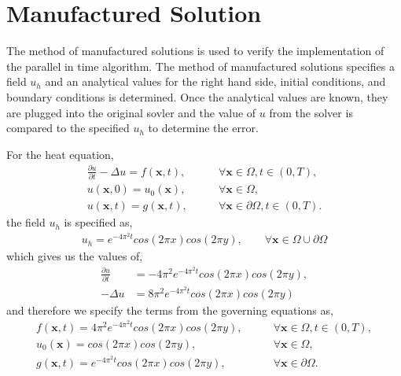 \documentclass{article}
\begin{document}
\section{Manufactured Solution}
\label{sec:MFGSol}

The method of manufactured solutions is used to verify the implementation of the
parallel in time algorithm.
The method of manufactured solutions specifies a field $u_h$ and an
analytical values for the right hand side, initial conditions, and boundary
conditions is determined.
Once the analytical values are known, they are plugged into the original sovler
and the value of $u$ from the solver is compared to the specified $u_h$ to
determine the error.

For the heat equation,
\begin{align*}
  \frac{\partial u}{\partial t} - \Delta u = f(\boldsymbol{x},t), \qquad &\forall\boldsymbol{x}\in\Omega,t\in\left( 0,T \right), \\
  u(\boldsymbol{x},0) = u_0(\boldsymbol{x}), \qquad &\forall \boldsymbol{x}\in\Omega, \\
  u(\boldsymbol{x},t) = g(\boldsymbol{x},t), \qquad &\forall \boldsymbol{x}\in\partial\Omega,t\in\left( 0,T \right).
\end{align*}
the field $u_h$ is specified as,
\begin{align*}
  u_h = e^{-4\pi^2t}cos(2 \pi x)cos(2 \pi y), \qquad \forall \boldsymbol{x} \in \Omega \cup \partial\Omega
\end{align*}
which gives us the values of,
\begin{align*}
  \frac{\partial u}{\partial t} &= -4 \pi^2 e^{-4\pi^2t}cos(2 \pi x)cos(2 \pi y), \\
  -\Delta u &= 8 \pi^2 e^{-4\pi^2t}cos(2 \pi x)cos(2 \pi y)
\end{align*}
and therefore we specify the terms from the governing equations as,
\begin{align*}
  f(\boldsymbol{x},t) = 4 \pi^2 e^{-4\pi^2t}cos(2 \pi x)cos(2 \pi y), \qquad&\forall\boldsymbol{x}\in\Omega,t\in\left( 0,T \right), \\
  u_0(\boldsymbol{x}) = cos(2 \pi x)cos(2 \pi y), \qquad &\forall \boldsymbol{x}\in\Omega, \\
  g(\boldsymbol{x},t) = e^{-4\pi^2t}cos(2 \pi x)cos(2 \pi y), \qquad &\forall \boldsymbol{x} \in \partial\Omega.
\end{align*}
\end{document}
